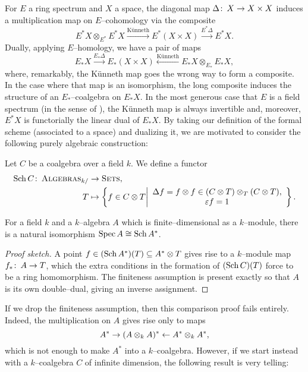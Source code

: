 For \(E\) a ring spectrum and \(X\) a space, the diagonal map \(\Delta\colon\thinspace X \to X \times X\) induces a multiplication map on \(E\)--cohomology via the composite \[E^* X \otimes_{E^*} E^* X \xrightarrow{\text{K\"unneth}} E^*(X \times X) \xrightarrow{E^* \Delta} E^* X.\]  Dually, applying \(E\)--homology, we have a pair of maps \[E_* X \xrightarrow{E_* \Delta} E_*(X \times X) \xleftarrow{\text{K\"unneth}} E_* X \otimes_{E_*} E_* X,\] where, remarkably, the K\"unneth map goes the wrong way to form a composite.  In the case where that map is an isomorphism, the long composite induces the structure of an \(E_*\)--coalgebra on \(E_* X\).  In the most generous case that \(E\) is a field spectrum (in the sense of ), the K\"unneth map is always invertible and, moreover, \(E^* X\) is functorially the linear dual of \(E_* X\).  By taking our definition of the formal scheme (associated to a space) and dualizing it, we are motivated to consider the following purely algebraic construction:

\begin{definition}
Let \(C\) be a coalgebra over a field \(k\).  We define a functor
\begin{align*}
\operatorname{Sch} C\colon\thinspace \normalfont\textsc{Algebras}_{k/} & \to \normalfont\textsc{Sets}, \\
T & \mapsto \left\{f \in C \otimes T \middle| \begin{array}{c} \Delta f = f \otimes f \in (C \otimes T) \otimes_T (C \otimes T), \\ \varepsilon f = 1 \end{array} \right\}.
\end{align*}
\end{definition}

\begin{lemma}
For a field \(k\) and a \(k\)--algebra \(A\) which is finite--dimensional as a \(k\)--module, there is a natural isomorphism \(\operatorname{Spec} A \cong \operatorname{Sch} A^*\).
\end{lemma}
\begin{proof}[Proof sketch]
A point \(f \in (\operatorname{Sch} A^*)(T) \subseteq A^* \otimes T\) gives rise to a \(k\)--module map \(f_*\colon\thinspace A \to T\), which the extra conditions in the formation of \((\operatorname{Sch} C)(T)\) force to be a ring homomorphism.  The finiteness assumption is present exactly so that \(A\) is its own double--dual, giving an inverse assignment.
\end{proof}

If we drop the finiteness assumption, then this comparison proof fails entirely.  Indeed, the multiplication on \(A\) gives rise only to maps \[A^* \to (A \otimes_k A)^* \leftarrow A^* \otimes_k A^*,\] which is not enough to make \(A^*\) into a \(k\)--coalgebra.  However, if we start instead with a \(k\)--coalgebra \(C\) of infinite dimension, the following result is very telling:

